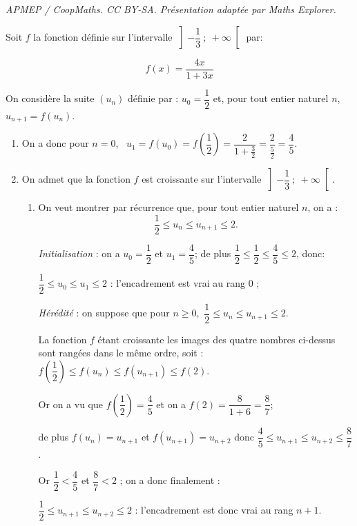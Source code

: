 \documentclass[10pt]{article}
\begin{document}
\noindent\textit{APMEP / CoopMaths. CC BY-SA. Présentation adaptée par Maths Explorer.}\par\medskip
\medskip

Soit $f$ la fonction définie sur l'intervalle $\left]-\dfrac{1}{3}~;~+\infty\right[$ par:

\[ f(x) = \dfrac{4x}{1 + 3x}\]

On considère la suite $\left(u_n\right)$ définie par : $u_0 = \dfrac{1}{2}$ et, pour tout entier naturel $n$,\, $u_{n+1} = f\left(u_n\right)$.

\medskip

\begin{enumerate}
\item 
On a donc pour $n = 0$, \, $u_1 = f\left(u_0\right) = f\left(\dfrac{1}{2}\right) = \dfrac{2}{1 + \frac{3}{2}} = \dfrac{2}{\frac{5}{2}} = \dfrac{4}{5}$.
\item On admet que la fonction $f$ est croissante sur l'intervalle $\left]-\dfrac{1}{3}~;~+\infty\right[$.
	\begin{enumerate}
		\item On veut montrer par récurrence que, pour tout entier naturel $n$, on a : 
		\[\dfrac{1}{2} \leqslant u_n \leqslant u_{n+1} \leqslant 2.\]
		
		
\emph{Initialisation} : on a $u_0=\dfrac{1}{2}$ et $u_1=\dfrac{4}{5}$; de plus $\dfrac{1}{2} \leqslant \dfrac{1}{2} \leqslant \dfrac{4}{5} \leqslant 2$, donc:
		
$\dfrac{1}{2} \leqslant u_0 \leqslant u_1\leqslant 2$ : l'encadrement est vrai au rang 0 ;

\emph{Hérédité} : on suppose que pour $n \geqslant 0$,\, $\dfrac{1}{2} \leqslant u_n \leqslant u_{n+1} \leqslant 2$.

La fonction $f$ étant croissante les images des quatre nombres ci-dessus sont rangées dans le même ordre, soit :
$f\left(\dfrac{1}{2}\right) \leqslant f\left(u_n\right) \leqslant f\left(u_{n+1}\right) \leqslant f(2)$.

Or on a vu que $f\left(\dfrac{1}{2}\right) = \dfrac{4}{5}$ et on a $f(2) = \dfrac{8}{1 + 6} = \dfrac{8}{7}$;

de plus $f(u_{n})= u_{n+1}$ et $f(u_{n+1})= u_{n+2}$ donc 
$\dfrac{4}{5} \leqslant  u_{n+1} \leqslant u_{n+2} \leqslant \dfrac{8}{7}$.

Or $\dfrac{1}{2} < \dfrac{4}{5}$ et $\dfrac{8}{7} < 2$ ; on a donc finalement :

$\dfrac{1}{2} \leqslant  u_{n+1} \leqslant u_{n+2} \leqslant 2$ : l'encadrement est donc vrai au rang $n + 1$.


\end{enumerate}
\end{enumerate}
\end{document}
